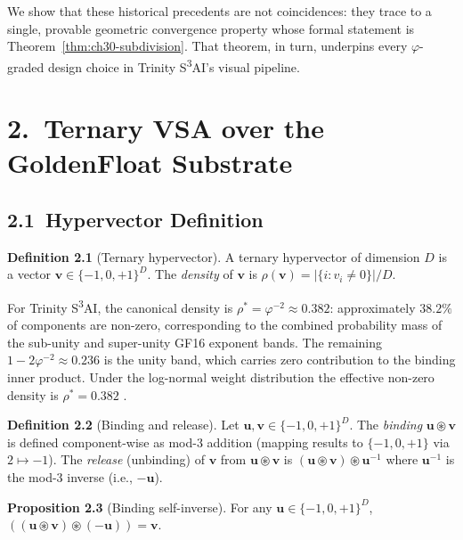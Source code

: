 We show that these historical precedents are not
coincidences: they trace to a single, provable
geometric convergence property whose formal
statement is Theorem~\ref{thm:ch30-subdivision}.
That theorem, in turn, underpins every $\varphi$-
graded design choice in Trinity S\textsuperscript{3}AI's visual
pipeline.

\section{2.\ Ternary VSA over the GoldenFloat
  Substrate}\label{sec:ch30-vsa}

\subsection{2.1\ Hypervector
  Definition}\label{subsec:ch30-hypvec-def}

\textbf{Definition 2.1} (Ternary hypervector).
A ternary hypervector of dimension \(D\) is a
vector \(\mathbf{v} \in \{-1, 0, +1\}^D\).  The
\emph{density} of \(\mathbf{v}\) is
\(\rho(\mathbf{v}) = |\{i : v_i \neq 0\}| / D\).

For Trinity S\textsuperscript{3}AI, the canonical
density is \(\rho^{*} = \varphi^{-2} \approx
0.382\): approximately $38.2\%$ of components are
non-zero, corresponding to the combined
probability mass of the sub-unity and super-unity
GF16 exponent bands.  The remaining
$1 - 2\varphi^{-2} \approx 0.236$ is the unity
band, which carries zero contribution to the
binding inner product.  Under the log-normal
weight distribution the effective non-zero density
is \(\rho^{*} = 0.382\) \cite{rachkovskij_binding}.

\textbf{Definition 2.2} (Binding and release).
Let \(\mathbf{u}, \mathbf{v} \in \{-1,0,+1\}^D\).
The \emph{binding} \(\mathbf{u} \circledast
\mathbf{v}\) is defined component-wise as mod-3
addition (mapping results to \(\{-1,0,+1\}\) via
\(2 \mapsto -1\)).  The \emph{release} (unbinding)
of \(\mathbf{v}\) from
\(\mathbf{u} \circledast \mathbf{v}\) is
\((\mathbf{u} \circledast \mathbf{v}) \circledast
\mathbf{u}^{-1}\) where \(\mathbf{u}^{-1}\) is
the mod-3 inverse (i.e., \(-\mathbf{u}\)).

\textbf{Proposition 2.3} (Binding self-inverse).
For any \(\mathbf{u} \in \{-1,0,+1\}^D\),
\(((\mathbf{u} \circledast \mathbf{v}) \circledast
(-\mathbf{u})) = \mathbf{v}\).

